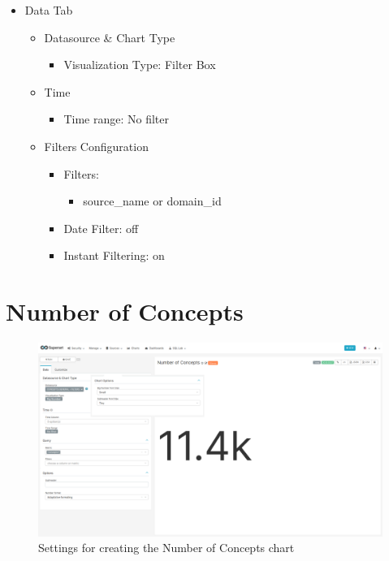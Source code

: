 \documentclass[
]{book}
\providecommand{\tightlist}{%
  \setlength{\itemsep}{0pt}\setlength{\parskip}{0pt}}
\begin{document}
\begin{itemize}
\tightlist
\item
  Data Tab

  \begin{itemize}
  \tightlist
  \item
    Datasource \& Chart Type

    \begin{itemize}
    \tightlist
    \item
      Visualization Type: Filter Box
    \end{itemize}
  \item
    Time

    \begin{itemize}
    \tightlist
    \item
      Time range: No filter
    \end{itemize}
  \item
    Filters Configuration

    \begin{itemize}
    \tightlist
    \item
      Filters:

      \begin{itemize}
      \tightlist
      \item
        source\_name or domain\_id
      \end{itemize}
    \item
      Date Filter: off
    \item
      Instant Filtering: on
    \end{itemize}
  \end{itemize}
\end{itemize}

\hypertarget{number-of-concepts}{%
\section{Number of Concepts}\label{number-of-concepts}}

\begin{figure}
\includegraphics[width=1\linewidth]{images/08-concepts_browser/02-number_of_concepts} \caption{Settings for creating the Number of Concepts chart}\label{fig:numOfConcepts}
\end{figure}
\end{document}
